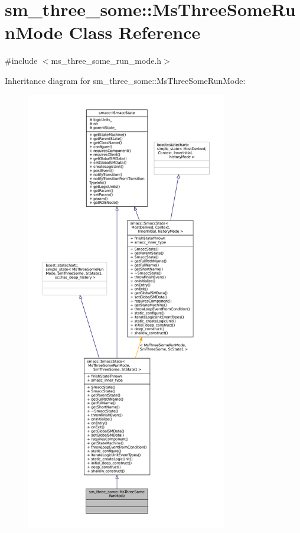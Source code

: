 \hypertarget{classsm__three__some_1_1MsThreeSomeRunMode}{}\section{sm\+\_\+three\+\_\+some\+:\+:Ms\+Three\+Some\+Run\+Mode Class Reference}
\label{classsm__three__some_1_1MsThreeSomeRunMode}


{\ttfamily \#include $<$ms\+\_\+three\+\_\+some\+\_\+run\+\_\+mode.\+h$>$}



Inheritance diagram for sm\+\_\+three\+\_\+some\+:\+:Ms\+Three\+Some\+Run\+Mode\+:
\nopagebreak
\begin{figure}[H]
\begin{center}
\leavevmode
\includegraphics[height=550pt]{classsm__three__some_1_1MsThreeSomeRunMode__inherit__graph}
\end{center}
\end{figure}


